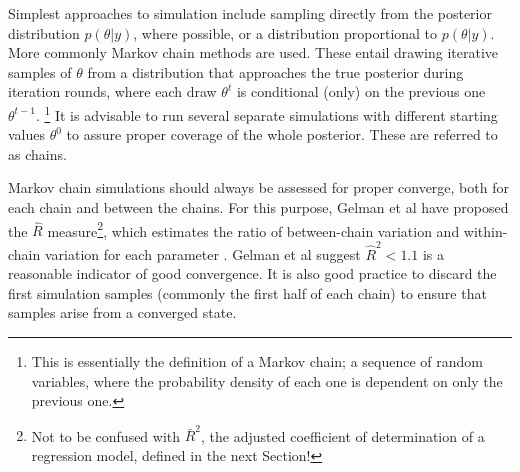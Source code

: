 Simplest approaches to simulation include sampling directly from the posterior
distribution $p(\theta|y)$, where possible, or a distribution proportional
to $p(\theta|y)$. More commonly Markov chain methods are used. These entail
drawing iterative samples of $\theta$ from a distribution that approaches
the true posterior during iteration rounds, where each draw $\theta^t$ is
conditional (only) on the previous one $\theta^{t-1}$.
\footnote{This is essentially the definition of a Markov chain; a sequence of random
variables, where the probability density of each one is dependent on only the
previous one.} It is advisable to run several separate simulations with
different starting values $\theta^0$ to assure proper coverage of the whole
posterior. These are referred to as chains.

Markov chain simulations should always be assessed for proper converge, both
for each chain and between the chains. For this purpose, Gelman et al have
proposed the $\hat{R}$ measure\footnote{Not to be confused with $\bar{R}^2$,
the adjusted coefficient of determination of a regression model, defined in
the next Section!}, which estimates the ratio of between-chain variation and
within-chain variation for each parameter \citep{Gelman2013}. Gelman et al
suggest $\hat{R}^2 < 1.1$ is a reasonable indicator of good convergence. It is
also good practice to discard the first simulation samples (commonly the first
half of each chain) to ensure that samples arise from a converged state.



